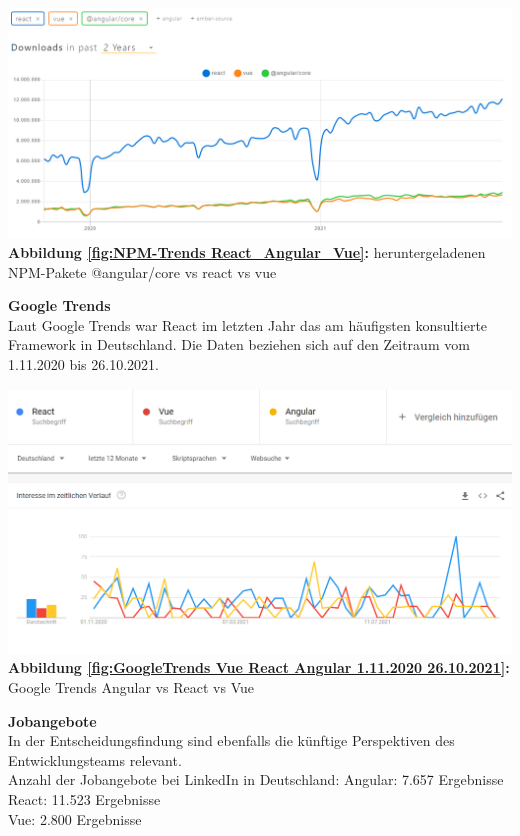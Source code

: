 \begin{center}
  \includegraphics[scale=0.4]{sources/NPM-Trends React_Angular_Vue}\label{fig:NPM-Trends React_Angular_Vue}\\
  \textbf{Abbildung \autoref{fig:NPM-Trends React_Angular_Vue}:} heruntergeladenen NPM-Pakete @angular/core vs react vs vue
    {\cite{NPM01}}
\end{center}

\textbf{Google Trends}\\
Laut Google Trends war React im letzten Jahr das am häufigsten konsultierte Framework in Deutschland.
Die Daten beziehen sich auf den Zeitraum vom 1.11.2020 bis 26.10.2021.
\begin{center}
  \includegraphics[scale=0.5]{sources/GoogleTrends Vue React Angular 1.11.2020 26.10.2021}\label{fig:GoogleTrends Vue React Angular 1.11.2020 26.10.2021}\\
  \textbf{Abbildung \autoref{fig:GoogleTrends Vue React Angular 1.11.2020 26.10.2021}:} Google Trends Angular vs React vs Vue
    {\cite{GO01}}
\end{center}

\textbf{Jobangebote}\\
In der Entscheidungsfindung sind ebenfalls die künftige Perspektiven des Entwicklungsteams relevant.
\\
Anzahl der Jobangebote bei LinkedIn in Deutschland:
Angular: 7.657 Ergebnisse{\cite{LI3}}
\\
React: 11.523 Ergebnisse{\cite{LI2}}
\\
Vue: 2.800 Ergebnisse{\cite{LI1}}



